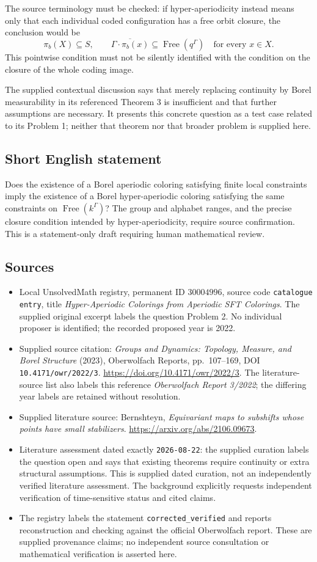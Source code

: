 \documentclass[11pt]{article}
\begin{document}
The source terminology must be checked: if hyper-aperiodicity instead means only that each individual coded configuration has a free orbit closure, the conclusion would be
\[
\pi_b(X)\subseteq S,
\qquad
\overline{\Gamma\cdot\pi_b(x)}\subseteq\operatorname{Free}(q^\Gamma)
\quad\text{for every }x\in X.
\]
This pointwise condition must not be silently identified with the condition on the closure of the whole coding image.

The supplied contextual discussion says that merely replacing continuity by Borel measurability in its referenced Theorem 3 is insufficient and that further assumptions are necessary. It presents this concrete question as a test case related to its Problem 1; neither that theorem nor that broader problem is supplied here.
\subsection{Short English statement}
Does the existence of a Borel aperiodic coloring satisfying finite local constraints imply the existence of a Borel hyper-aperiodic coloring satisfying the same constraints on \(\operatorname{Free}(k^\Gamma)\)? The group and alphabet ranges, and the precise closure condition intended by hyper-aperiodicity, require source confirmation. This is a statement-only draft requiring human mathematical review.
\subsection{Sources}
\begin{itemize}
\item Local UnsolvedMath registry, permanent ID \(30004996\), source code \texttt{catalogue entry}, title \emph{Hyper-Aperiodic Colorings from Aperiodic SFT Colorings}. The supplied original excerpt labels the question Problem 2. No individual proposer is identified; the recorded proposed year is 2022.
\item Supplied source citation: \emph{Groups and Dynamics: Topology, Measure, and Borel Structure} (2023), Oberwolfach Reports, pp.\ 107--169, DOI \texttt{10.4171/owr/2022/3}. \url{https://doi.org/10.4171/owr/2022/3}. The literature-source list also labels this reference \emph{Oberwolfach Report 3/2022}; the differing year labels are retained without resolution.
\item Supplied literature source: Bernshteyn, \emph{Equivariant maps to subshifts whose points have small stabilizers}. \url{https://arxiv.org/abs/2106.09673}.
\item Literature assessment dated exactly \texttt{2026-08-22}: the supplied curation labels the question open and says that existing theorems require continuity or extra structural assumptions. This is supplied dated curation, not an independently verified literature assessment. The background explicitly requests independent verification of time-sensitive status and cited claims.
\item The registry labels the statement \texttt{corrected\_verified} and reports reconstruction and checking against the official Oberwolfach report. These are supplied provenance claims; no independent source consultation or mathematical verification is asserted here.
\end{itemize}
\end{document}
